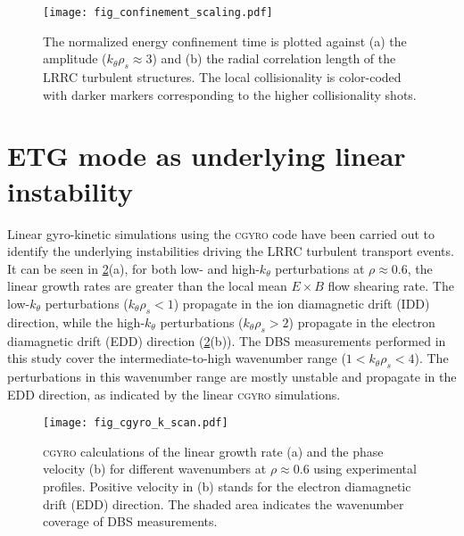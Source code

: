\documentclass[english,aip,pop,superscriptaddress,preprint,letterpaper]{revtex4-2}
\begin{document}
\begin{figure}
  \texttt{[image: fig\_confinement\_scaling.pdf]}
  \caption{\label{fig:confinement_scaling} The normalized energy confinement time is plotted against (a) the amplitude ($k_{\theta}\rho_{s}\approx3$) and (b) the radial correlation length of the LRRC turbulent structures. The local collisionality is color-coded with darker markers corresponding to the higher collisionality shots.}
\end{figure}

\section{ETG mode as underlying linear instability\label{sec:linear_cgyro}}

Linear gyro-kinetic simulations using the \textsc{cgyro} code\cite{candyHighaccuracyEulerianGyrokinetic2016} have been carried out to identify the underlying instabilities driving the LRRC turbulent transport events.
It can be seen in \cref{fig:k_scan}(a), for both low- and high-$k_{\theta}$ perturbations at $\rho\approx0.6$, the linear growth rates are greater than the local mean $E \times B$ flow shearing rate.
The low-$k_{\theta}$ perturbations ($k_{\theta}\rho_{s}<1$) propagate in the ion diamagnetic drift (IDD) direction, while the high-$k_{\theta}$ perturbations ($k_{\theta}\rho_{s}>2$) propagate in the electron diamagnetic drift (EDD) direction (\cref{fig:k_scan}(b)).
The DBS measurements performed in this study cover the intermediate-to-high wavenumber range ($1<k_{\theta}\rho_{s}<4$).
The perturbations in this wavenumber range are mostly unstable and propagate in the EDD direction, as indicated by the linear \textsc{cgyro} simulations.

\begin{figure}
  \centering
  \texttt{[image: fig\_cgyro\_k\_scan.pdf]}
  \caption{\label{fig:k_scan} \textsc{cgyro} calculations of the linear growth rate (a) and the phase velocity (b) for different wavenumbers at $\rho\approx0.6$ using experimental profiles. Positive velocity in (b) stands for the electron diamagnetic drift (EDD) direction. The shaded area indicates the wavenumber coverage of DBS measurements.}
\end{figure}
\end{document}
